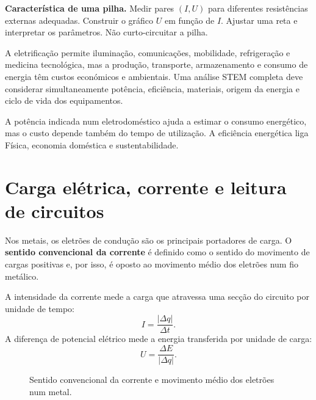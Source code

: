 \documentclass[11pt,a4paper,oneside]{book}
\begin{document}
\begin{atividade}[title=Extensão -- característica de uma pilha]
\textbf{Característica de uma pilha.} Medir pares $(I,U)$ para diferentes resistências externas adequadas. Construir o gráfico $U$ em função de $I$. Ajustar uma reta e interpretar os parâmetros. Não curto-circuitar a pilha.
\end{atividade}

\begin{mundo}
A eletrificação permite iluminação, comunicações, mobilidade, refrigeração e medicina tecnológica, mas a produção, transporte, armazenamento e consumo de energia têm custos económicos e ambientais. Uma análise STEM completa deve considerar simultaneamente potência, eficiência, materiais, origem da energia e ciclo de vida dos equipamentos.

A potência indicada num eletrodoméstico ajuda a estimar o consumo energético, mas o custo depende também do tempo de utilização. A eficiência energética liga Física, economia doméstica e sustentabilidade.
\end{mundo}


\section{Carga elétrica, corrente e leitura de circuitos}
Nos metais, os eletrões de condução são os principais portadores de carga. O \textbf{sentido convencional da corrente} é definido como o sentido do movimento de cargas positivas e, por isso, é oposto ao movimento médio dos eletrões num fio metálico.

A intensidade da corrente mede a carga que atravessa uma secção do circuito por unidade de tempo:
\[
I=\frac{|\Delta q|}{\Delta t}.
\]
A diferença de potencial elétrico mede a energia transferida por unidade de carga:
\[
U=\frac{\Delta E}{|\Delta q|}.
\]

\begin{figure}[H]
\centering
{}
\caption{Sentido convencional da corrente e movimento médio dos eletrões num metal.}
\end{figure}
\end{document}
